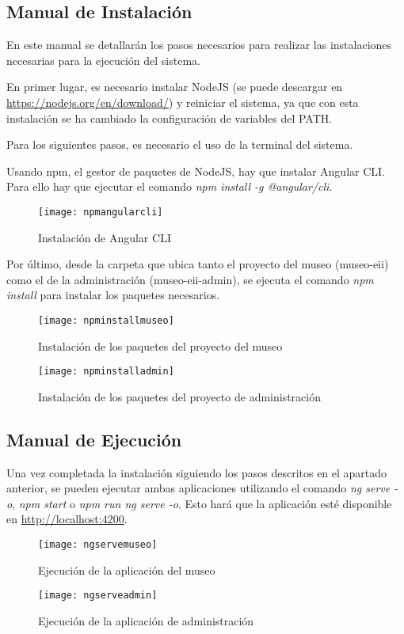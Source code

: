 \subsection{Manual de Instalación} 
En este manual se detallarán los pasos necesarios para realizar las instalaciones necesarias para la ejecución del sistema.\par
En primer lugar, es necesario instalar NodeJS (se puede descargar en \url{https://nodejs.org/en/download/}) y reiniciar el sistema, ya que con esta instalación se ha cambiado la configuración de variables del PATH.\par
Para los siguientes pasos, es necesario el uso de la terminal del sistema.\par
Usando npm, el gestor de paquetes de NodeJS, hay que instalar Angular CLI. Para ello hay que ejecutar el comando \textit{npm install -g @angular/cli}.
\begin{figure}[H]
\centering
\texttt{[image: npmangularcli]}
\caption{Instalación de Angular CLI}
\end{figure}
Por último, desde la carpeta que ubica tanto el proyecto del museo (museo-eii) como el de la administración (museo-eii-admin), se ejecuta el comando \textit{npm install} para instalar los paquetes necesarios.
\begin{figure}[H]
\centering
\texttt{[image: npminstallmuseo]}
\caption{Instalación de los paquetes del proyecto del museo}
\end{figure}
\begin{figure}[H]
\centering
\texttt{[image: npminstalladmin]}
\caption{Instalación de los paquetes del proyecto de administración}
\end{figure}


\subsection{Manual de Ejecución} 
Una vez completada la instalación siguiendo los pasos descritos en el apartado anterior, se pueden ejecutar ambas aplicaciones utilizando el comando \textit{ng serve -o}, \textit{npm start} o \textit{npm run ng serve -o}. Esto hará que la aplicación esté disponible en \url{http://localhost:4200}.
\begin{figure}[H]
\centering
\texttt{[image: ngservemuseo]}
\caption{Ejecución de la aplicación del museo}
\end{figure}
\begin{figure}[H]
\centering
\texttt{[image: ngserveadmin]}
\caption{Ejecución de la aplicación de administración}
\end{figure}



